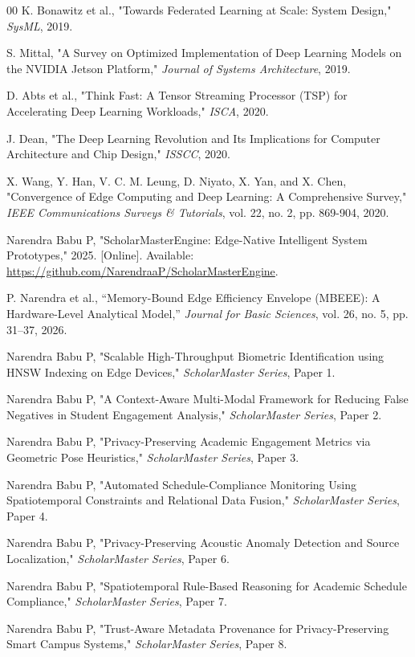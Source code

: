 \documentclass[conference]{IEEEtran}
\begin{document}
\begin{thebibliography}{00}
 K. Bonawitz et al., "Towards Federated Learning at Scale: System Design," \textit{SysML}, 2019.

 S. Mittal, "A Survey on Optimized Implementation of Deep Learning Models on the NVIDIA Jetson Platform," \textit{Journal of Systems Architecture}, 2019.

 D. Abts et al., "Think Fast: A Tensor Streaming Processor (TSP) for Accelerating Deep Learning Workloads," \textit{ISCA}, 2020.

 J. Dean, "The Deep Learning Revolution and Its Implications for Computer Architecture and Chip Design," \textit{ISSCC}, 2020.


 X. Wang, Y. Han, V. C. M. Leung, D. Niyato, X. Yan, and X. Chen, "Convergence of Edge Computing and Deep Learning: A Comprehensive Survey," \textit{IEEE Communications Surveys \& Tutorials}, vol. 22, no. 2, pp. 869-904, 2020.

 Narendra Babu P, "ScholarMasterEngine: Edge-Native Intelligent System Prototypes," 2025. [Online]. Available: \url{https://github.com/NarendraaP/ScholarMasterEngine}.

 P. Narendra et al., ``Memory-Bound Edge Efficiency Envelope (MBEEE): A Hardware-Level Analytical Model,'' \textit{Journal for Basic Sciences}, vol. 26, no. 5, pp. 31--37, 2026.

 Narendra Babu P, "Scalable High-Throughput Biometric Identification using HNSW Indexing on Edge Devices," \textit{ScholarMaster Series}, Paper 1.

 Narendra Babu P, "A Context-Aware Multi-Modal Framework for Reducing False Negatives in Student Engagement Analysis," \textit{ScholarMaster Series}, Paper 2.

 Narendra Babu P, "Privacy-Preserving Academic Engagement Metrics via Geometric Pose Heuristics," \textit{ScholarMaster Series}, Paper 3.

 Narendra Babu P, "Automated Schedule-Compliance Monitoring Using Spatiotemporal Constraints and Relational Data Fusion," \textit{ScholarMaster Series}, Paper 4.

 Narendra Babu P, "Privacy-Preserving Acoustic Anomaly Detection and Source Localization," \textit{ScholarMaster Series}, Paper 6.

 Narendra Babu P, "Spatiotemporal Rule-Based Reasoning for Academic Schedule Compliance," \textit{ScholarMaster Series}, Paper 7.

 Narendra Babu P, "Trust-Aware Metadata Provenance for Privacy-Preserving Smart Campus Systems," \textit{ScholarMaster Series}, Paper 8.


\end{thebibliography}
\end{document}
